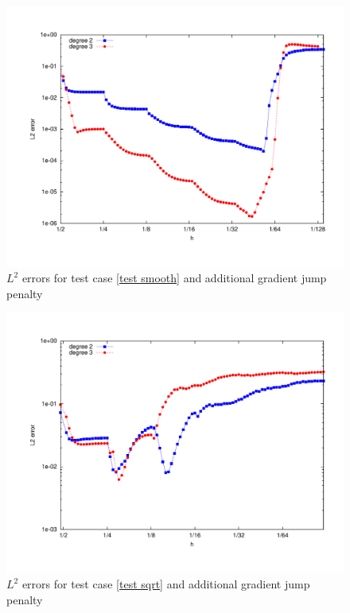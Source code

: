 \begin{figure}[h!]
	\includegraphics[scale =0.5]{plots/MA1.pdf}
	\caption{$L^2$ errors for test case \ref{test smooth} and additional gradient jump penalty}
	\label{fig: l2 errors test smooth ourMethod}
\end{figure}

\begin{figure}[h!]
	\includegraphics[scale =0.5]{plots/MA3.pdf}
	\caption{$L^2$ errors for test case \ref{test sqrt} and additional gradient jump penalty}
	\label{fig: l2 errors test sqrt ourMethod}
\end{figure}


